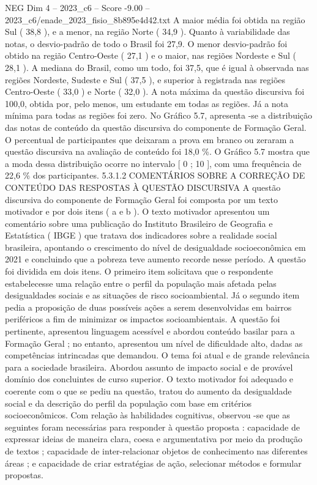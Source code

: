 \begin{textsample}{NEG Dim 4 – 2023\_c6 – Score -9.00 – 2023\_c6/enade\_2023\_fisio\_8b895e4d42.txt}
A maior média foi obtida na região Sul ( 38,8 ), e a menor, na região Norte ( 34,9 ).
Quanto à variabilidade das notas, o desvio-padrão de todo o Brasil foi 27,9.
O menor desvio-padrão foi obtido na região Centro-Oeste ( 27,1 ) e o maior, nas regiões Nordeste e Sul ( 28,1 ).
A mediana do Brasil, como um todo, foi 37,5, que é igual à observada nas regiões Nordeste, Sudeste e Sul ( 37,5 ), e superior à registrada nas regiões Centro-Oeste ( 33,0 ) e Norte ( 32,0 ).
A nota máxima da questão discursiva foi 100,0, obtida por, pelo menos, um estudante em todas as regiões.
Já a nota mínima para todas as regiões foi zero.
No Gráfico 5.7, apresenta -se a distribuição das notas de conteúdo da questão discursiva do componente de Formação Geral.
O percentual de participantes que deixaram a prova em branco ou zeraram a questão discursiva na avaliação de conteúdo foi 18,0 \%.
O Gráfico 5.7 mostra que a moda dessa distribuição ocorre no intervalo [ 0 ; 10 ], com uma frequência de 22,6 \% dos participantes. 5.3.1.2 COMENTÁRIOS SOBRE A CORREÇÃO DE CONTEÚDO DAS RESPOSTAS À QUESTÃO DISCURSIVA A questão discursiva do componente de Formação Geral foi composta por um texto motivador e por dois itens ( a e b ).
O texto motivador apresentou um comentário sobre uma publicação do Instituto Brasileiro de Geografia e Estatística ( IBGE ) que tratava dos indicadores sobre a realidade social brasileira, apontando o crescimento do nível de desigualdade socioeconômica em 2021 e concluindo que a pobreza teve aumento recorde nesse período.
A questão foi dividida em dois itens.
O primeiro item solicitava que o respondente estabelecesse uma relação entre o perfil da população mais afetada pelas desigualdades sociais e as situações de risco socioambiental.
Já o segundo item pedia a proposição de duas possíveis ações a serem desenvolvidas em bairros periféricos a fim de minimizar os impactos socioambientais.
A questão foi pertinente, apresentou linguagem acessível e abordou conteúdo basilar para a Formação Geral ; no entanto, apresentou um nível de dificuldade alto, dadas as competências intrincadas que demandou.
O tema foi atual e de grande relevância para a sociedade brasileira.
Abordou assunto de impacto social e de provável domínio dos concluintes de curso superior.
O texto motivador foi adequado e coerente com o que se pediu na questão, tratou do aumento da desigualdade social e da descrição do perfil da população com base em critérios socioeconômicos.
Com relação às habilidades cognitivas, observou -se que as seguintes foram necessárias para responder à questão proposta : capacidade de expressar ideias de maneira clara, coesa e argumentativa por meio da produção de textos ; capacidade de inter-relacionar objetos de conhecimento nas diferentes áreas ; e capacidade de criar estratégias de ação, selecionar métodos e formular propostas.

\end{textsample}
